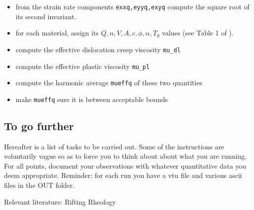 \documentclass[a4paper]{article}
\begin{document}
\begin{itemize}
\item from the strain rate components {\tt exxq,eyyq,exyq} compute the square root of its second invariant.
\item for each material, assign its $Q,n,V,A,c,\phi,\alpha,T_0$ values (see Table 1 of \cite{nabu15}).
\item compute the effective dislocation creep viscosity {\tt mu\_dl}
\item compute the effective plastic viscosity {\tt mu\_pl}
\item compute the harmonic average {\tt mueffq} of these two quantities 
\item make {\tt mueffq} sure it is between acceptable bounds
\end{itemize}



\subsection{To go further}

Hereafter is a list of tasks to be carried out. Some of the instructions are voluntarily vague so as to force you to think about about what you are running. For all points, document your observations with whatever quantitative data you deem appropriate. Reminder: for each run you have a vtu file and various ascii files in the OUT folder.

Relevant literature: 
Rifting \cite{hube03,hubb05,hube07,hube11,bupb09,alht11,alht12,alhf13,engl83,vacl02} 
Rheology \cite{buro11,budr08,hiko03,kawu93}
\end{document}
